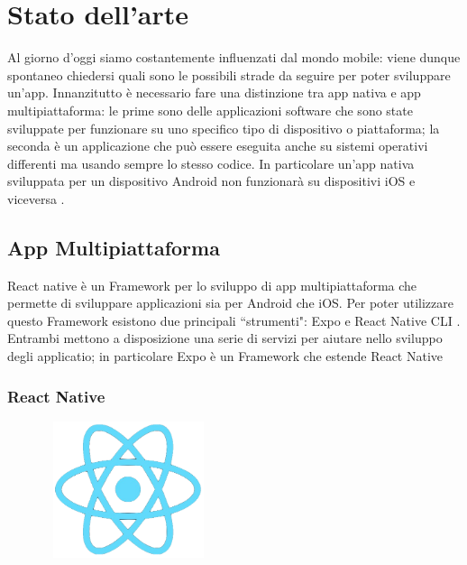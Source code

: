 \chapter{Stato dell'arte}
Al giorno d'oggi siamo costantemente influenzati dal mondo mobile: viene dunque spontaneo chiedersi quali sono le possibili strade da seguire per poter sviluppare un'app.
Innanzitutto \`e necessario fare una distinzione tra app nativa e app multipiattaforma:
le prime sono delle applicazioni software che sono state sviluppate per funzionare su uno
specifico tipo di dispositivo o piattaforma; la seconda \`e un applicazione che pu\`o essere eseguita anche su sistemi operativi differenti ma usando sempre lo stesso codice.
In particolare un'app nativa sviluppata per un dispositivo Android non funzionar\`a su dispositivi iOS e viceversa \cite{ReactNativeCLI:Expo} \cite{app:ibride:native}.\\

\section{App Multipiattaforma}
React native \`e un Framework per lo sviluppo di app multipiattaforma che permette di sviluppare applicazioni sia per Android che iOS.
Per poter utilizzare questo Framework esistono due principali ``strumenti": Expo \cite{ReactNativeCLI:Expo} e React Native CLI \cite{ReactNativeCLI:Expo}.
Entrambi mettono a disposizione una serie di servizi per aiutare nello sviluppo degli applicatio; in particolare Expo \`e un Framework che estende React Native
\subsection{React Native}
\begin{figure}[h]
      \centering
      \includegraphics[width=5cm, height=4cm]{images/ReactNativeLogo-NoBackground.png}
      \caption[differenzeiteot]{}
      \label{fig:ReactNative}
\end{figure}


